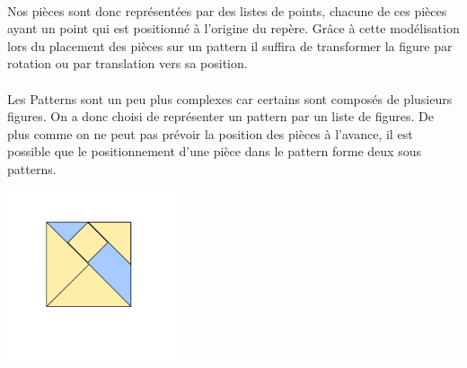 \documentclass{report}
\begin{document}
        \paragraph{}Nos pièces sont donc représentées par des listes de points, chacune de ces
        pièces ayant un point qui est positionné à l'origine du repère. Grâce à cette modélisation
        lors du placement des pièces sur un pattern il suffira de transformer la figure par rotation
        ou par translation vers sa position.

        \paragraph{}Les Patterns sont un peu plus complexes car certains sont composés de plusieurs
        figures. On a donc choisi de représenter un pattern par un liste de figures. De plus
        comme on ne peut pas prévoir la position des pièces à l'avance, il est possible que le
        positionnement d'une pièce dans le pattern forme deux sous patterns.


        \begin{center}
            \includegraphics[width=5cm]{representation_sousfigure}
        \end{center}
\end{document}
